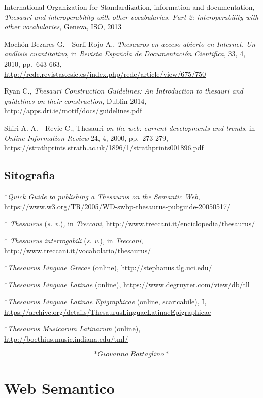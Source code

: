 \documentclass[
  b5paper,
  twoside,
  12pt,
  chapterprefix=false,
  bibliography=totocnumbered,
  parskip=false]{scrbook}
\begin{document}
International Organization for Standardization, information and
documentation, \emph{Thesauri and interoperability with other vocabularies.
Part 2: interoperability with other vocabularies}, Geneva, ISO, 2013

Mochón Bezares G. - Sorli Rojo A., \emph{Thesauros en acceso abierto en
Internet. Un análisis cuantitativo}, in \emph{Revista Española de
Documentación Cientifica}, 33, 4, 2010, pp.~643-663,
\url{http://redc.revistas.csic.es/index.php/redc/article/view/675/750}

Ryan C., \emph{Thesauri Construction Guidelines: An Introduction to thesauri
and guidelines on their construction}, Dublin 2014,
\url{http://apps.dri.ie/motif/docs/guidelines.pdf}

Shiri A. A. - Revie C., Thesauri \emph{on the web: current developments and
trends}, in \emph{Online Information Review} 24, 4, 2000, pp.~273-279,
\url{https://strathprints.strath.ac.uk/1896/1/strathprints001896.pdf}

\hypertarget{sitografia-32}{%
\section*{Sitografia}\label{sitografia-32}}

*\emph{Quick Guide to publishing a Thesaurus on the Semantic Web},
\url{https://www.w3.org/TR/2005/WD-swbp-thesaurus-pubguide-20050517/}

* \emph{Thesaurus} (\emph{s. v.})\emph{,} in \emph{Treccani},
\url{http://www.treccani.it/enciclopedia/thesaurus/}

* \emph{Thesaurus} \emph{interrogabili} (\emph{s. v.})\emph{,} in \emph{Treccani},
\url{http://www.treccani.it/vocabolario/thesaurus/}

*\emph{Thesaurus Linguae Grecae} (online),
\url{http://stephanus.tlg.uci.edu/}

*\emph{Thesaurus Linguae Latinae} (online),
\url{https://www.degruyter.com/view/db/tll}

*\emph{Thesaurus Linguae Latinae Epigraphicae} (online, scaricabile), I,
\url{https://archive.org/details/ThesaurusLinguaeLatinaeEpigraphicae}

*\emph{Thesaurus Musicarum Latinarum} (online),
\url{http://boethius.music.indiana.edu/tml/}

\[*Giovanna~Battaglino*\]

\hypertarget{web-semantico}{%
\chapter{Web Semantico}\label{web-semantico}}
\end{document}
